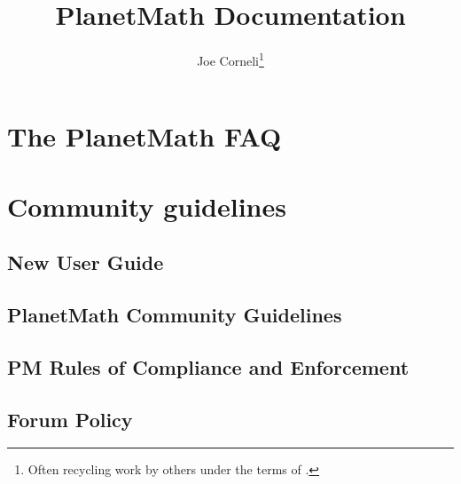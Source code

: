 \documentclass[12pt,report]{memoir}
\begin{document}
\renewcommand{\abstract}[1]{\begin{center}\begin{quote}
\emph{#1}
\end{quote}\end{center}}

\title{PlanetMath Documentation}
\author{Joe Corneli\thanks{Often recycling work by others under the terms of \ccbysa.}}

\begin{titlingpage}
\maketitle
\end{titlingpage}

\frontmatter

\renewcommand{\cftchapterfont}{\scshape}
\renewcommand{\cftchapterpagefont}{\scshape}

\tableofcontents*
\cleardoublepage

\mainmatter

\chapter{The PlanetMath FAQ}


\chapter{Community guidelines}

\section{New User Guide}


\section{PlanetMath Community Guidelines}


\section{PM Rules of Compliance and Enforcement}


\section{Forum Policy}

\end{document}
